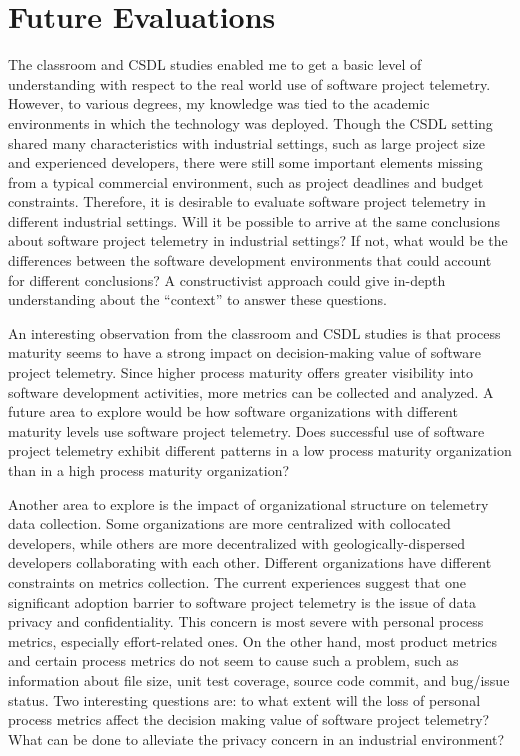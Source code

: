 \section{Future Evaluations} \label{EvaluationConclusion:FutureEvaluation}

The classroom and CSDL studies enabled me to get a basic level of understanding with respect to the real world use of software project telemetry. However, to various degrees, my knowledge was tied to the academic environments in which the technology was deployed. Though the CSDL setting shared many characteristics with industrial settings, such as large project size and experienced developers, there were still some important elements missing from a typical commercial environment, such as project deadlines and budget constraints. Therefore, it is desirable to evaluate software project telemetry in different industrial settings. Will it be possible to arrive at the same conclusions about software project telemetry in industrial settings? If not, what would be the differences between the software development environments that could account for different conclusions? A constructivist approach could give in-depth understanding about the ``context'' to answer these questions.

An interesting observation from the classroom and CSDL studies is that process maturity seems to have a strong impact on decision-making value of software project telemetry. Since higher process maturity offers greater visibility into software development activities, more metrics can be collected and analyzed. A future area to explore would be how software organizations with different maturity levels use software project telemetry. Does successful use of software project telemetry exhibit different patterns in a low process maturity organization than in a high process maturity organization? 

Another area to explore is the impact of organizational structure on telemetry data collection. Some organizations are more centralized with collocated developers, while others are more decentralized with geologically-dispersed developers collaborating with each other. Different organizations have different constraints on metrics collection. The current experiences suggest that one significant adoption barrier to software project telemetry is the issue of data privacy and confidentiality. This concern is most severe with personal process metrics, especially effort-related ones. On the other hand, most product metrics and certain process metrics do not seem to cause such a problem, such as information about file size, unit test coverage, source code commit, and bug/issue status. Two interesting questions are: to what extent will the loss of personal process metrics affect the decision making value of software project telemetry? What can be done to alleviate the privacy concern in an industrial environment?

